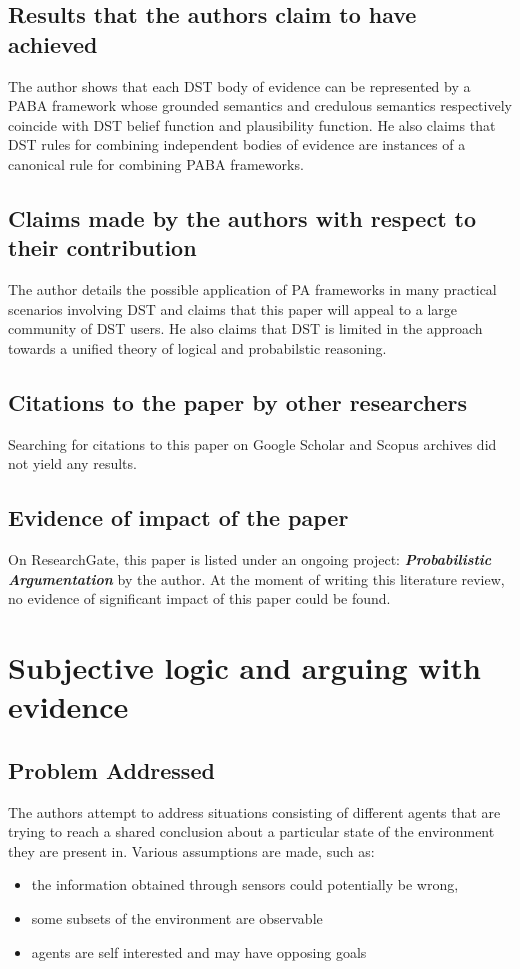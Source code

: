 \documentclass[UTF8]{article}
\begin{document}
\subsection{Results that the authors claim to have achieved}
The author shows that each DST body of evidence can be represented by a PABA framework whose grounded semantics and credulous semantics respectively coincide with DST belief
function and plausibility function. He also claims that DST rules for combining independent bodies of evidence are instances of a canonical rule for combining PABA frameworks.

\subsection{Claims made by the authors with respect to their contribution}
The author details the possible application of PA frameworks in many practical scenarios involving 
DST and claims that this paper will appeal to a large community of DST users. He also claims that DST is limited in the approach towards a unified theory of logical and probabilstic reasoning.

\subsection{Citations to the paper by other researchers}
Searching for citations to this paper on Google Scholar and Scopus archives did not yield any results.
\subsection{Evidence of impact of the paper}
On ResearchGate, this paper is listed under an ongoing project: \textbf{\textit{Probabilistic Argumentation}} by the author. At the moment of writing this literature review, no evidence of significant impact of this paper could be found.

\section{Subjective logic and arguing with evidence}
\subsection{Problem Addressed}
The authors attempt to address situations consisting of different agents that are trying to reach a shared conclusion about a particular state of the environment 
they are present in. Various assumptions are made, such as: 
\begin{itemize}
  \item the information obtained through sensors could potentially be wrong, 
  \item some subsets of the environment are observable
  \item agents are self interested and may have opposing goals 
\end{itemize}
\end{document}

